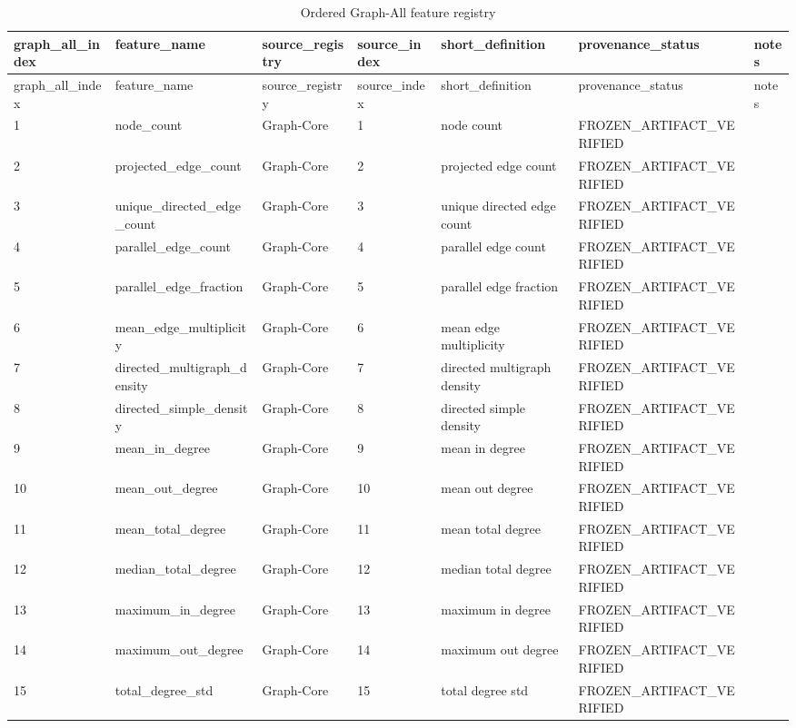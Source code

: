 \begin{longtable}{lllllll}
\caption{Ordered Graph-All feature registry}\\
\toprule
graph\_all\_index & feature\_name & source\_registry & source\_index & short\_definition & provenance\_status & notes \\
\midrule
\endfirsthead
\toprule
graph\_all\_index & feature\_name & source\_registry & source\_index & short\_definition & provenance\_status & notes \\
\midrule
\endhead
1 & node\_count & Graph-Core & 1 & node count & FROZEN\_ARTIFACT\_VERIFIED &  \\
2 & projected\_edge\_count & Graph-Core & 2 & projected edge count & FROZEN\_ARTIFACT\_VERIFIED &  \\
3 & unique\_directed\_edge\_count & Graph-Core & 3 & unique directed edge count & FROZEN\_ARTIFACT\_VERIFIED &  \\
4 & parallel\_edge\_count & Graph-Core & 4 & parallel edge count & FROZEN\_ARTIFACT\_VERIFIED &  \\
5 & parallel\_edge\_fraction & Graph-Core & 5 & parallel edge fraction & FROZEN\_ARTIFACT\_VERIFIED &  \\
6 & mean\_edge\_multiplicity & Graph-Core & 6 & mean edge multiplicity & FROZEN\_ARTIFACT\_VERIFIED &  \\
7 & directed\_multigraph\_density & Graph-Core & 7 & directed multigraph density & FROZEN\_ARTIFACT\_VERIFIED &  \\
8 & directed\_simple\_density & Graph-Core & 8 & directed simple density & FROZEN\_ARTIFACT\_VERIFIED &  \\
9 & mean\_in\_degree & Graph-Core & 9 & mean in degree & FROZEN\_ARTIFACT\_VERIFIED &  \\
10 & mean\_out\_degree & Graph-Core & 10 & mean out degree & FROZEN\_ARTIFACT\_VERIFIED &  \\
11 & mean\_total\_degree & Graph-Core & 11 & mean total degree & FROZEN\_ARTIFACT\_VERIFIED &  \\
12 & median\_total\_degree & Graph-Core & 12 & median total degree & FROZEN\_ARTIFACT\_VERIFIED &  \\
13 & maximum\_in\_degree & Graph-Core & 13 & maximum in degree & FROZEN\_ARTIFACT\_VERIFIED &  \\
14 & maximum\_out\_degree & Graph-Core & 14 & maximum out degree & FROZEN\_ARTIFACT\_VERIFIED &  \\
15 & total\_degree\_std & Graph-Core & 15 & total degree std & FROZEN\_ARTIFACT\_VERIFIED &  \\

\end{longtable}
